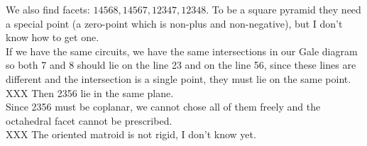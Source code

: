 \documentclass[paper=a4, fontsize=11pt]{scrartcl} %
\theoremstyle{plain}
\begin{document}
We also find facets: $14568,14567,12347,12348$. To be a square pyramid they need a special point (a zero-point which is non-plus and non-negative), but I don't know how to get one.\\

If we have the same circuits, we have the same intersections in our Gale diagram so both 7 and 8 should lie on the line 23 and on the line 56, since these lines are different and the intersection is a single point, they must lie on the same point.\\

XXX Then 2356 lie in the same plane.\\

Since 2356 must be coplanar, we cannot chose all of them freely and the octahedral facet cannot be prescribed.\\

XXX The oriented matroid is not rigid, I don't know yet.
\end{document}
